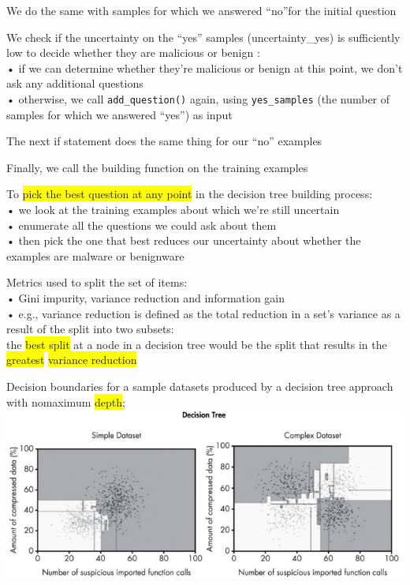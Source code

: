 \documentclass[]{project_plan}
\newcommand*\circled[1]{\tikz[baseline=(char.base)]{
            \node[shape=circle,draw,inner sep=2pt] (char) {#1};}}
\begin{document}
We do the same with samples for which we answered “no”for the initial question \circled{3}

We check if the uncertainty on the “yes” samples (uncertainty\_yes) is
sufficiently low to decide whether they are malicious or benign \circled{4} :\\
• if we can determine whether they’re malicious or benign at this point, we don’t ask any
additional questions\\
• otherwise, we call \lstinline|add_question()| again, using \lstinline|yes_samples| (the number of
samples for which we answered “yes”) as input

The next if statement does the same thing for our “no” examples \circled{5}

Finally, we call the building function on the training examples \circled{6}

To \colorbox{yellow}{pick the best question at any point} in the decision tree building process:\\
• we look at the training examples about which we’re still uncertain\\
• enumerate all the questions we could ask about them\\
• then pick the one that best reduces our uncertainty about whether the examples are
malware or benignware

Metrics used to split the set of items:\\
• Gini impurity, variance reduction and information gain\\
• e.g., variance reduction is defined as the total reduction in a set’s variance as a result of
the split into two subsets:\\
the \colorbox{yellow}{best split} at a node in a decision tree would be the split that results in the \colorbox{yellow}{greatest} \colorbox{yellow}{variance
  reduction}

\newpage

Decision boundaries for a sample datasets produced by a decision tree approach with nomaximum \colorbox{yellow}{depth};\\
\includegraphics[width=.8\linewidth]{ml76.png}
\end{document}
